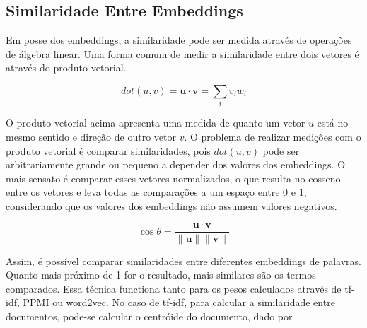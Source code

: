 \documentclass[
	12pt,				%
	openright,			%
	oneside,			%
	a4paper,			%
	english,			%
	french,				%
	spanish,			%
	brazil				%
	]{abntex2}
\begin{document}

\subsection{Similaridade Entre Embeddings}\label{subsec:similaridade-entre-embeddings}

Em posse dos embeddings, a similaridade pode ser medida através de operações de álgebra linear.
Uma forma comum de medir a similaridade entre dois vetores é através do produto vetorial.

$$dot(u,v) = \mathbf{u} \cdot \mathbf{v} = \sum_{i}v_{i}w_{i}$$

O produto vetorial acima apresenta uma medida de quanto um vetor $u$ está no mesmo sentido e direção de outro vetor $v$.
O problema de realizar medições com o produto vetorial é comparar similaridades, pois $dot(u,v)$ pode ser arbitrariamente
grande ou pequeno a depender dos valores dos embeddings.
O mais sensato é comparar esses vetores normalizados, o que resulta no cosseno entre os vetores e leva todas as comparações
a um espaço entre 0 e 1, considerando que os valores dos embeddings não assumem valores negativos.

$$\cos \theta = \frac{\mathbf{u} \cdot \mathbf{v}}{\|\mathbf{u}\| \|\mathbf{v}\|}$$

Assim, é possível comparar similaridades entre diferentes embeddings de palavras.
Quanto mais próximo de 1 for o resultado, mais similares são os termos comparados.
Essa técnica functiona tanto para os pesos calculados através de tf-idf, PPMI ou word2vec.
No caso de tf-idf, para calcular a similaridade entre documentos, pode-se calcular o centróide do documento, dado por
\end{document}
